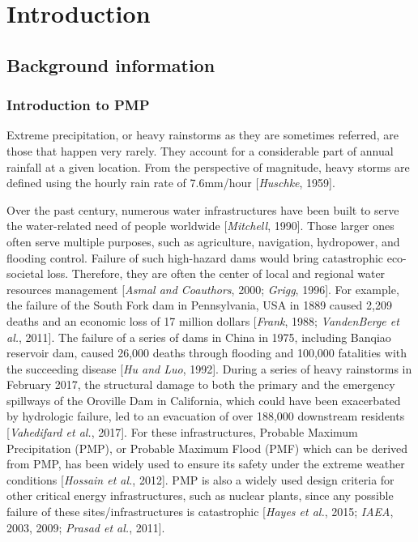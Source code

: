 \chapter {Introduction}
\label{ch:intro}

\section {Background information}

\subsection{Introduction to PMP}

Extreme precipitation, or heavy rainstorms as they are sometimes referred, are those that happen very rarely. They account for a considerable part of annual rainfall at a given location. From the perspective of magnitude, heavy storms are defined using the hourly rain rate of 7.6mm/hour [\textit{Huschke}, 1959].

Over the past century, numerous water infrastructures have been built to serve the water-related need of people worldwide [\textit{Mitchell}, 1990]. Those larger ones often serve multiple purposes, such as agriculture, navigation, hydropower, and flooding control. Failure of such high-hazard dams would bring catastrophic eco-societal loss. Therefore, they are often the center of local and regional water resources management [\textit{Asmal and Coauthors}, 2000; \textit{Grigg}, 1996]. For example, the failure of the South Fork dam in Pennsylvania, USA in 1889 caused 2,209 deaths and an economic loss of 17 million dollars [\textit{Frank}, 1988; \textit{VandenBerge et al.}, 2011].  The failure of a series of dams in China in 1975, including Banqiao reservoir dam, caused 26,000 deaths through flooding and 100,000 fatalities with the succeeding disease [\textit{Hu and Luo}, 1992]. During a series of heavy rainstorms in February 2017, the structural damage to both the primary and the emergency spillways of the Oroville Dam in California, which could have been exacerbated by hydrologic failure, led to an evacuation of over 188,000 downstream residents [\textit{Vahedifard et al.}, 2017]. For these infrastructures, Probable Maximum Precipitation (PMP), or Probable Maximum Flood (PMF) which can be derived from PMP,  has been widely used to ensure its safety under the extreme weather conditions [\textit{Hossain et al.}, 2012]. PMP is also a widely used design criteria for other critical energy infrastructures, such as nuclear plants, since any possible failure of these sites/infrastructures is catastrophic [\textit{Hayes et al.}, 2015; \textit{IAEA}, 2003, 2009; \textit{Prasad et al.}, 2011].

